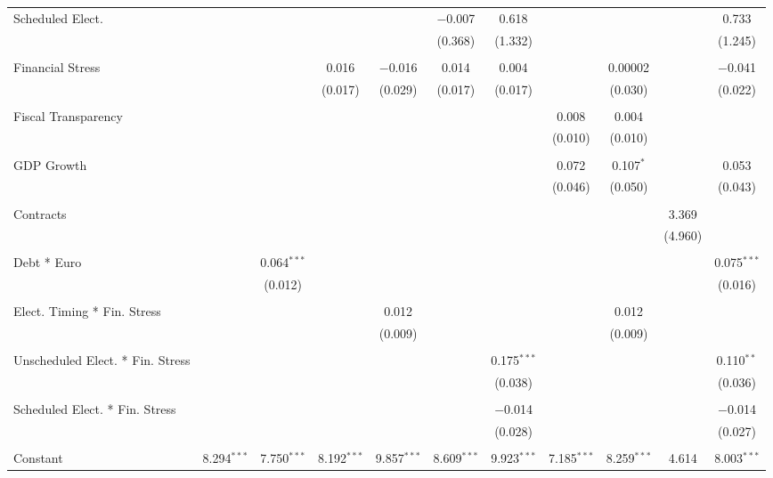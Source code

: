 \begin{table}[!htbp]
\begin{tabular}{@{\extracolsep{5pt}}lcccccccccc}
 Scheduled Elect. &  &  &  &  & $-$0.007 & 0.618 &  &  &  & 0.733 \\ 
  &  &  &  &  & (0.368) & (1.332) &  &  &  & (1.245) \\ 
  & & & & & & & & & & \\ 
 Financial Stress &  &  & 0.016 & $-$0.016 & 0.014 & 0.004 &  & 0.00002 &  & $-$0.041 \\ 
  &  &  & (0.017) & (0.029) & (0.017) & (0.017) &  & (0.030) &  & (0.022) \\ 
  & & & & & & & & & & \\ 
 Fiscal Transparency &  &  &  &  &  &  & 0.008 & 0.004 &  &  \\ 
  &  &  &  &  &  &  & (0.010) & (0.010) &  &  \\ 
  & & & & & & & & & & \\ 
 GDP Growth &  &  &  &  &  &  & 0.072 & 0.107$^{*}$ &  & 0.053 \\ 
  &  &  &  &  &  &  & (0.046) & (0.050) &  & (0.043) \\ 
  & & & & & & & & & & \\ 
 Contracts &  &  &  &  &  &  &  &  & 3.369 &  \\ 
  &  &  &  &  &  &  &  &  & (4.960) &  \\ 
  & & & & & & & & & & \\ 
 Debt * Euro &  & 0.064$^{***}$ &  &  &  &  &  &  &  & 0.075$^{***}$ \\ 
  &  & (0.012) &  &  &  &  &  &  &  & (0.016) \\ 
  & & & & & & & & & & \\ 
 Elect. Timing * Fin. Stress &  &  &  & 0.012 &  &  &  & 0.012 &  &  \\ 
  &  &  &  & (0.009) &  &  &  & (0.009) &  &  \\ 
  & & & & & & & & & & \\ 
 Unscheduled Elect. * Fin. Stress &  &  &  &  &  & 0.175$^{***}$ &  &  &  & 0.110$^{**}$ \\ 
  &  &  &  &  &  & (0.038) &  &  &  & (0.036) \\ 
  & & & & & & & & & & \\ 
 Scheduled Elect. * Fin. Stress &  &  &  &  &  & $-$0.014 &  &  &  & $-$0.014 \\ 
  &  &  &  &  &  & (0.028) &  &  &  & (0.027) \\ 
  & & & & & & & & & & \\ 
 Constant & 8.294$^{***}$ & 7.750$^{***}$ & 8.192$^{***}$ & 9.857$^{***}$ & 8.609$^{***}$ & 9.923$^{***}$ & 7.185$^{***}$ & 8.259$^{***}$ & 4.614 & 8.003$^{***}$ \\ 

\end{tabular}
\end{table}
